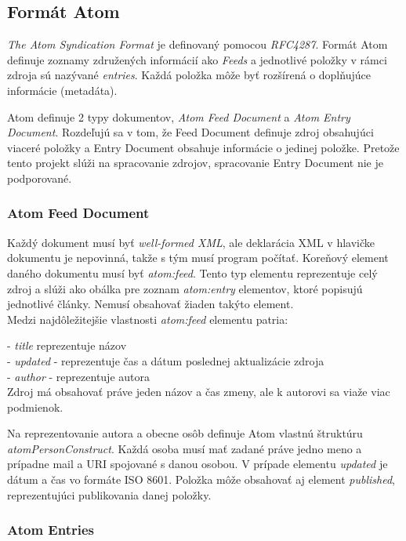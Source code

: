 \documentclass[11pt,a4paper]{article}
\begin{document}
\subsection{Formát Atom}
\textit{The Atom Syndication Format} je definovaný pomocou \textit{RFC4287}.
Formát Atom definuje zoznamy združených informácií ako \textit{Feeds} a jednotlivé položky v rámci zdroja sú nazývané \textit{entries}. Každá položka môže byť rozšírená o doplňujúce informácie (metadáta).

Atom definuje 2 typy dokumentov, \textit{Atom Feed Document} a \textit{Atom Entry Document}.
Rozdeľujú sa v tom, že Feed Document definuje zdroj obsahujúci viaceré položky a Entry Document obsahuje informácie o jedinej položke. Pretože tento projekt slúži na spracovanie zdrojov, spracovanie Entry Document nie je podporované.

\subsubsection{Atom Feed Document}

Každý dokument musí byť \textit{well-formed XML}, ale deklarácia XML v hlavičke dokumentu je nepovinná, takže s tým musí program počítať. 
Koreňový element daného dokumentu musí byť \textit{atom:feed}. Tento typ elementu reprezentuje celý zdroj a slúži ako obálka pre zoznam \textit{atom:entry} elementov, ktoré popisujú jednotlivé články. Nemusí obsahovať žiaden takýto element.\\


\noindent Medzi najdôležitejšie vlastnosti \textit{atom:feed} elementu patria:

\noindent - \textit{title} reprezentuje názov \\
- \textit{updated} - reprezentuje čas a dátum poslednej aktualizácie zdroja \\
- \textit{author} - reprezentuje autora \\

Zdroj má obsahovať práve jeden názov a čas zmeny, ale k autorovi sa viaže viac podmienok.

Na reprezentovanie autora a obecne osôb definuje Atom vlastnú štruktúru  \textit{atomPersonConstruct}. Každá osoba musí mať zadané práve jedno meno a prípadne mail a URI spojované s danou osobou. V prípade elementu \textit{updated} je dátum a čas vo formáte ISO 8601. Položka môže obsahovať aj element \textit{published}, reprezentujúci publikovania danej položky.

\subsubsection{Atom Entries}
\end{document}
